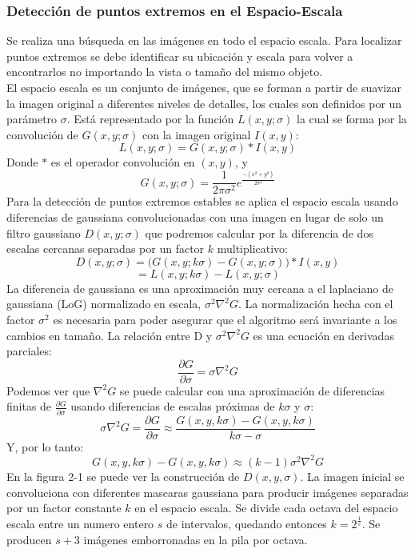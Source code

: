 \subsubsection{Detección de puntos extremos en el Espacio-Escala} 
Se realiza una búsqueda en las imágenes en todo el espacio escala. Para localizar puntos extremos se debe identificar su ubicación y escala para volver a encontrarlos no importando la vista o tamaño del mismo objeto.\\
El espacio escala es un conjunto de imágenes, que se forman a partir de suavizar la imagen original a diferentes niveles de detalles, los cuales son definidos por un parámetro $\sigma$. Está representado por la función $L(x,y;\sigma)$ la cual se forma por la convolución de $G(x,y;\sigma)$ con la imagen original $I(x,y)$:
$$L(x,y;\sigma) = G(x,y;\sigma) * I(x,y)$$
Donde $*$ es el operador convolución en $(x,y)$, y
$$ G(x,y;\sigma) = \frac{1}{2\pi\sigma^2}e^{\frac{-(x^2+y^2)}{2\sigma^2}}$$
Para la detección de puntos extremos estables se aplica el espacio escala usando diferencias de gaussiana convolucionadas con una imagen en lugar de solo un filtro gaussiano $D(x,y;\sigma)$  que podremos calcular por la diferencia de dos escalas cercanas separadas por un factor $k$ multiplicativo:
$$D(x,y;\sigma) = \big(G(x,y;k\sigma) - G(x,y;\sigma)\big) * I(x,y)$$ $$= L(x,y;k\sigma) - L(x,y;\sigma)$$
La diferencia de gaussiana es una aproximación muy cercana a el laplaciano de gaussiana (LoG) normalizado en escala, $\sigma^2 \nabla^2 G$. La normalización hecha con el factor $\sigma^2$ es necesaria para poder asegurar que el algoritmo será invariante a los cambios en tamaño. La relación entre D y $\sigma^2 \nabla^2 G$ es una ecuación en derivadas parciales:
$$\frac{\partial G}{\partial \sigma} = \sigma \nabla^2 G$$
Podemos ver que $\nabla^2 G$ se puede calcular con una aproximación de diferencias finitas de  $\frac{\partial G}{\partial \sigma}$ usando diferencias de escalas próximas de $k\sigma$ y $\sigma$:
$$ \sigma \nabla^2 G = \frac{ \partial G}{\partial \sigma} \approx  \frac{G(x , y , k \sigma) - G( x , y, k \sigma)}{k \sigma - \sigma}$$
Y, por lo tanto:
$$ G(x , y , k \sigma) - G( x , y, k \sigma) \approx (k - 1)\sigma^2 \nabla^2 G $$
En la figura 2-1 se puede ver la construcción de $D(x,y,\sigma)$. La imagen inicial se convoluciona con diferentes mascaras gaussiana para producir imágenes separadas por un factor constante $k$ en el espacio escala. Se divide cada octava del espacio escala entre un numero entero $s$ de intervalos, quedando entonces $k= 2^\frac{1}{s}$. Se producen $s+3$  imágenes emborronadas en la pila por octava.\\
